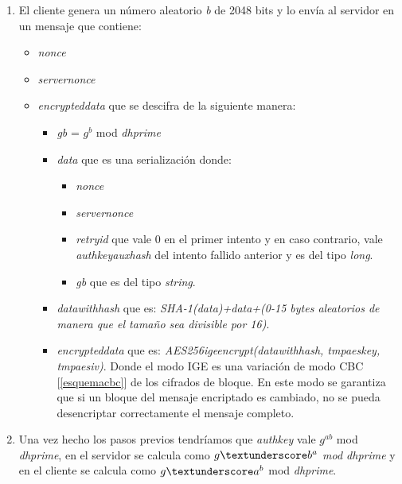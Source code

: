 \begin{enumerate}
	\item El cliente genera un número aleatorio \emph{b} de 2048 bits y lo envía al servidor en un mensaje que contiene:
		\begin{itemize}
			\item \emph{nonce}
			\item \emph{server\textunderscore nonce}
			\item \emph{encrypted\textunderscore data} que se descifra de la siguiente manera:
				\begin{itemize}
					\item \emph{g\textunderscore b} = $g^b$ mod \emph{dh\textunderscore prime}
					\item \emph{data} que es una serialización donde:
						\begin{itemize}
							\item \emph{nonce}
							\item \emph{server\textunderscore nonce}
							\item \emph{retry\textunderscore id} que vale 0 en el primer intento y en caso contrario, vale \emph{auth\textunderscore key\textunderscore aux\textunderscore hash} del intento fallido anterior y es del tipo \emph{long}.
							\item \emph{g\textunderscore b} que es del tipo \emph{string}.
						\end{itemize}
					\item \emph{data\textunderscore with\textunderscore hash} que es: \emph{SHA-1(data)+data+(0-15 bytes aleatorios de manera que el tamaño sea divisible por 16)}.
					\item \emph{encrypted\textunderscore data} que es: \emph{AES256\textunderscore ige\textunderscore encrypt(data\textunderscore with\textunderscore hash, tmp\textunderscore aes\textunderscore key, tmp\textunderscore aes\textunderscore iv)}. Donde el modo IGE es una variación de modo CBC [\ref{esquemacbc}] de los cifrados de bloque. En este modo se garantiza que si un bloque del mensaje encriptado es cambiado, no se pueda desencriptar correctamente el mensaje completo.
				\end{itemize}
		\end{itemize}
	\item Una vez hecho los pasos previos tendríamos que \emph{auth\textunderscore key} vale $g^{ab}$ mod \emph{dh\textunderscore prime}, en el servidor se calcula como \emph{$g\textunderscore b^{a}$ mod \emph{dh\textunderscore prime}} y en el cliente se calcula como $g\textunderscore a^b$ mod \emph{dh\textunderscore prime}.

\end{enumerate}
